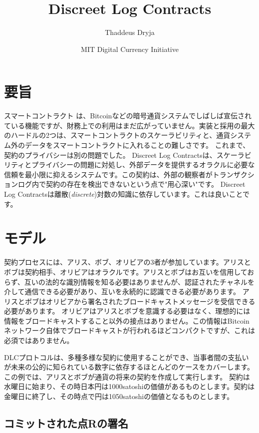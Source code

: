 \documentclass[11pt]{article}
\title{\textbf{Discreet Log Contracts}}
\author{Thaddeus Dryja}
\date{MIT Digital Currency Initiative}
\begin{document}
\maketitle

\section*{要旨}

スマートコントラクト \cite{szabo1997formalizing} は、Bitcoinなどの暗号通貨システムでしばしば宣伝されている機能ですが、財務上での利用はまだ広がっていません。実装と採用の最大のハードルの2つは、スマートコントラクトのスケーラビリティと、通貨システム外のデータをスマートコントラクトに入れることの難しさです。 これまで、契約のプライバシーは別の問題でした。 Discreet Log Contractsは、スケーラビリティとプライバシーの問題に対処し、外部データを提供するオラクルに必要な信頼を最小限に抑えるシステムです。この契約は、外部の観察者がトランザクションログ内で契約の存在を検出できないという点で"用心深い"です。 Discreet Log Contractsは離散(\textit{discrete})対数の知識に依存しています。これは良いことです。 


\section*{モデル}

契約プロセスには、アリス、ボブ、オリビアの3者が参加しています。アリスとボブは契約相手、オリビアはオラクルです。アリスとボブはお互いを信用しておらず、互いの法的な識別情報を知る必要はありませんが、認証されたチャネルを介して通信できる必要があり、互いを永続的に認識できる必要があります。 アリスとボブはオリビアから署名されたブロードキャストメッセージを受信できる必要があります。 オリビアはアリスとボブを意識する必要はなく、理想的には情報をブロードキャストすること以外の接点はありません。この情報はBitcoinネットワーク自体でブロードキャストが行われるほどコンパクトですが、これは必須ではありません。

DLCプロトコルは、多種多様な契約に使用することができ、当事者間の支払いが未来の公的に知られている数字に依存するほとんどのケースをカバーします。 この例では、アリスとボブが通貨の将来の契約を作成して実行します。 契約は水曜日に始まり、その時日本円は1000satoshiの価値があるものとします。契約は金曜日に終了し、その時点で円は1050satoshiの価値となるものとします。

\subsection*{コミットされた点Rの署名}
\end{document}
